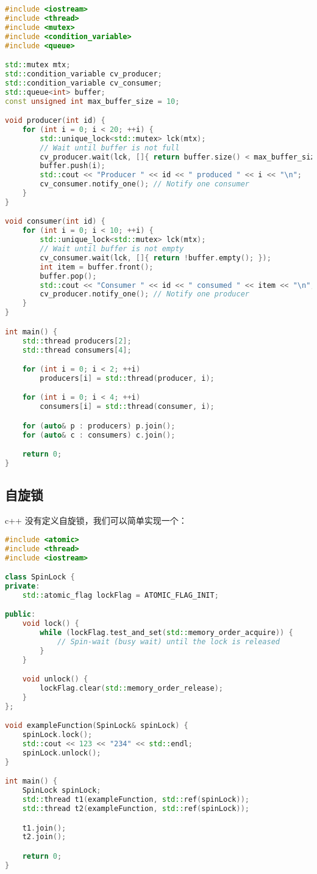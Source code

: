 \begin{lstlisting}[language=cpp]
#include <iostream>
#include <thread>
#include <mutex>
#include <condition_variable>
#include <queue>

std::mutex mtx;
std::condition_variable cv_producer;
std::condition_variable cv_consumer;
std::queue<int> buffer;
const unsigned int max_buffer_size = 10;

void producer(int id) {
    for (int i = 0; i < 20; ++i) {
        std::unique_lock<std::mutex> lck(mtx);
        // Wait until buffer is not full
        cv_producer.wait(lck, []{ return buffer.size() < max_buffer_size; });
        buffer.push(i);
        std::cout << "Producer " << id << " produced " << i << "\n";
        cv_consumer.notify_one(); // Notify one consumer
    }
}

void consumer(int id) {
    for (int i = 0; i < 10; ++i) {
        std::unique_lock<std::mutex> lck(mtx);
        // Wait until buffer is not empty
        cv_consumer.wait(lck, []{ return !buffer.empty(); });
        int item = buffer.front();
        buffer.pop();
        std::cout << "Consumer " << id << " consumed " << item << "\n";
        cv_producer.notify_one(); // Notify one producer
    }
}

int main() {
    std::thread producers[2];
    std::thread consumers[4];

    for (int i = 0; i < 2; ++i)
        producers[i] = std::thread(producer, i);

    for (int i = 0; i < 4; ++i)
        consumers[i] = std::thread(consumer, i);

    for (auto& p : producers) p.join();
    for (auto& c : consumers) c.join();

    return 0;
}
\end{lstlisting}

\subsection{自旋锁}
c++ 没有定义自旋锁，我们可以简单实现一个：
\begin{lstlisting}[language=cpp]
#include <atomic>
#include <thread>
#include <iostream>

class SpinLock {
private:
    std::atomic_flag lockFlag = ATOMIC_FLAG_INIT;

public:
    void lock() {
        while (lockFlag.test_and_set(std::memory_order_acquire)) {
            // Spin-wait (busy wait) until the lock is released
        }
    }

    void unlock() {
        lockFlag.clear(std::memory_order_release);
    }
};

void exampleFunction(SpinLock& spinLock) {
    spinLock.lock();
    std::cout << 123 << "234" << std::endl;
    spinLock.unlock();
}

int main() {
    SpinLock spinLock;
    std::thread t1(exampleFunction, std::ref(spinLock));
    std::thread t2(exampleFunction, std::ref(spinLock));

    t1.join();
    t2.join();

    return 0;
}
\end{lstlisting}

